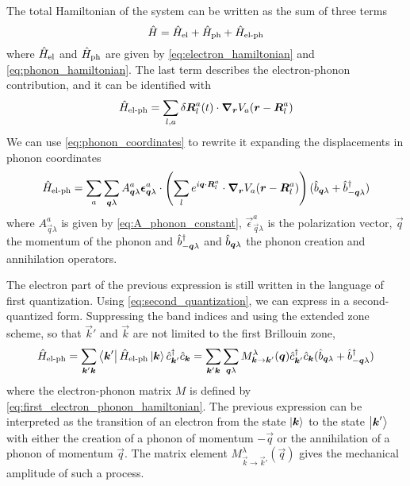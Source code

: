 The total Hamiltonian of the system can be written as the sum of three terms
\begin{equation}
    \hat{H} = \hat{H}_\text{el} + \hat{H}_\text{ph} + \hat{H}_\text{el-ph}
\end{equation}
where $\hat{H}_\text{el}$ and $\hat{H}_\text{ph}$ are given by \cref{eq:electron_hamiltonian} and \cref{eq:phonon_hamiltonian}. The last term describes the  electron-phonon contribution, and it can be identified with
\begin{equation}
    \hat{H}_\text{el-ph} = \sum_{l,a} \delta \mathbf{\boldsymbol{R}}_l^a(t) \cdot \grad_{\mathbf{\boldsymbol{r}}} V_a(\mathbf{\boldsymbol{r}} - \mathbf{\boldsymbol{R}}_l^a)
\end{equation}
We can use \cref{eq:phonon_coordinates} to rewrite it expanding the displacements in phonon coordinates
\begin{equation} \label{eq:first_electron_phonon_hamiltonian}
    \hat{H}_\text{el-ph} = \sum_{a} \sum_{\mathbf{\boldsymbol{q}}\lambda} A_{\mathbf{\boldsymbol{q}}\lambda}^a \mathbf{\boldsymbol{\epsilon}}_{\mathbf{\boldsymbol{q}}\lambda}^a \cdot \left( \sum_l e^{i\mathbf{\boldsymbol{q}} \cdot \mathbf{\boldsymbol{R}}_l^a}   \cdot \grad_{\mathbf{\boldsymbol{r}}} V_a(\mathbf{\boldsymbol{r}} - \mathbf{\boldsymbol{R}}_l^a) \right) (\hat{b}_{\mathbf{\boldsymbol{q}}\lambda} + \hat{b}^\dagger_{-\mathbf{\boldsymbol{q}}\lambda})
\end{equation}
where $A_{\vec{q}\lambda}^a$ is given by \cref{eq:A_phonon_constant}, $\vec{\epsilon}_{\vec{q}\lambda}^a$ is the polarization vector, $\vec{q}$ the momentum of the phonon and $\hat{b}^\dagger_{-\mathbf{\boldsymbol{q}}\lambda}$ and $\hat{b}_{\mathbf{\boldsymbol{q}}\lambda}$ the phonon creation and annihilation operators.

The electron part of the previous expression is still written in the language of first quantization. Using \cref{eq:second_quantization}, we can express in a second-quantized form. Suppressing the band indices and using the extended zone scheme, so that $\vec{k}'$ and $\vec{k}$ are not limited to the first Brillouin zone,
\begin{equation} \label{eq:general_electron_phonon_hamiltonian}
    \hat{H}_\text{el-ph} = \sum_{\mathbf{\boldsymbol{k}}'\mathbf{\boldsymbol{k}}} \bra{\mathbf{\boldsymbol{k}}'} \hat{H}_\text{el-ph} \ket{\mathbf{\boldsymbol{k}}} \hat{c}^\dagger_{\mathbf{\boldsymbol{k}}'}\hat{c}_{\mathbf{\boldsymbol{k}}}
    = \sum_{\mathbf{\boldsymbol{k}}'\mathbf{\boldsymbol{k}}} \sum_{\mathbf{\boldsymbol{q}}\lambda} M_{\mathbf{\boldsymbol{k}} \rightarrow \mathbf{\boldsymbol{k}}'}^\lambda(\mathbf{\boldsymbol{q}}) \hat{c}^\dagger_{\mathbf{\boldsymbol{k}}'}\hat{c}_{\mathbf{\boldsymbol{k}}} (\hat{b}_{\mathbf{\boldsymbol{q}}\lambda} + \hat{b}^\dagger_{-\mathbf{\boldsymbol{q}}\lambda})
\end{equation}
where the electron-phonon matrix $M$ is defined by \cref{eq:first_electron_phonon_hamiltonian}. The previous expression can be interpreted as the transition of an electron from the state $\ket{\mathbf{\boldsymbol{k}}}$ to the state $\ket{\mathbf{\boldsymbol{k}}'}$ with either the creation of a phonon of momentum $-\vec{q}$ or the annihilation of a phonon of momentum $\vec{q}$. The matrix element $M_{\vec{k} \rightarrow \vec{k}'}^\lambda(\vec{q})$ gives the mechanical amplitude of such a process.

